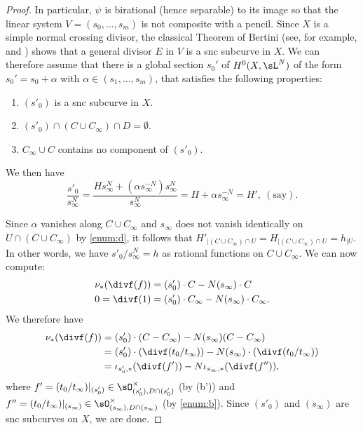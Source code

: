 \begin{proof}
In particular, $\psi$ is birational (hence separable) to its image so that the linear
system $V = (s_0, \ldots, s_m)$ is not composite with a pencil.
Since $X$ is a simple normal crossing divisor, the
classical Theorem of Bertini (see, for example, \cite[Th.\,I.6.3]{Zar58}
and \cite[Chap.\,6]{Jou})
shows that a general divisor $E$ in $V$ is a snc subcurve in $X$.
We can therefore assume that there is a global section $s_0'$ of
$H^0(X, \sL^{N})$ of the form $s_0' = s_0 +\alpha$ with
$\alpha \in (s_1,\ldots, s_m)$, that satisfies the following properties:\enlargethispage{.5\baselineskip}%
\begin{enumerate}\renewcommand{\theenumi}{\alph{enumi}$'$}
\item
$(s'_0)$ is a snc subcurve in $X$.
\item
$(s'_0) \cap (C \cup C_{\infty}) \cap D = \emptyset$.
\item
$C_{\infty} \cup C$ contains no component of $(s'_0)$.
\end{enumerate}

We then have\vspace*{-3pt}
\[
\frac{s'_0}{s^N_{\infty}} = \frac{Hs^N_{\infty} + (\alpha s^{-N}_{\infty})
s^N_{\infty}}{s^N_{\infty}} = H + \alpha s^{-N}_{\infty} = H', \ (\mbox{say}).
\]

Since $\alpha$ vanishes along $C \cup C_{\infty}$ and $s_{\infty}$ does not
vanish identically on $U\cap (C\cup C_\infty)$ by \eqref{enum:d}, it follows that
$H'_{|{(C \cup C_{\infty}) \cap U}} =
H_{|{(C \cup C_{\infty}) \cap U}} = h_{|U}$. In other words, we have
${s'_0}/{s^N_{\infty}} = h$ as rational functions on $C \cup C_{\infty}$.
We can now compute:\vspace*{-3pt}
\begin{align*}
\nu_*(\divf(f)) &= (s'_0) \cdot C - N (s_\infty) \cdot C\\
0 = \divf(1) &= (s'_0) \cdot C_{\infty} - N (s_\infty)\cdot C_{\infty}.
\end{align*}
We therefore have\vspace*{-3pt}
\begin{align*}
\nu_*(\divf(f)) & = (s'_0) \cdot (C - C_{\infty}) -
N(s_{\infty})(C - C_{\infty}) \\
& = (s'_0) \cdot (\divf({t_0}/{t_{\infty}})) - N(s_{\infty}) \cdot
(\divf({t_0}/{t_{\infty}})) \\
& = \iota_{{s'_0}, *}(\divf(f')) - N \iota_{{s_{\infty}}, *}(\divf(f'')),
\end{align*}
where $f' = ({t_0}/{t_{\infty}})|_{(s'_0)} \in
\sO^{\times}_{(s'_0), D \cap (s'_0)}$ (by (b')) and
$f'' = (t_0/t_{\infty})|_{(s_\infty)} \in
\sO_{(s_\infty), D\cap (s_\infty) }^{\times}$ (by \eqref{enum:b}).
Since $(s'_0)$ and $(s_\infty)$ are snc subcurves on $X$, we are done.
\end{proof}

